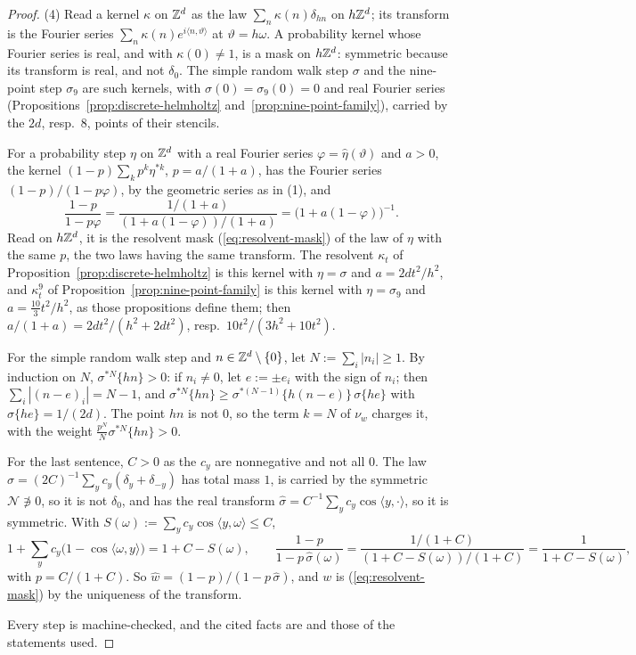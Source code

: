 \begin{proof}
(4) Read a kernel $\kappa$ on $\mathbb{Z}^d$ as the law $\sum_n\kappa(n)\delta_{hn}$ on $h\mathbb{Z}^d$; its
transform is the Fourier series $\sum_n\kappa(n)e^{i\langle n, \vartheta\rangle}$ at
$\vartheta = h\omega$. A probability kernel whose Fourier series is real, and with
$\kappa(0) \ne 1$, is a mask on $h\mathbb{Z}^d$: symmetric because its transform is real, and not
$\delta_0$. The simple random walk step $\sigma$ and the nine-point step $\sigma_9$ are such
kernels, with $\sigma(0) = \sigma_9(0) = 0$ and real Fourier series
(Propositions~\ref{prop:discrete-helmholtz} and~\ref{prop:nine-point-family}), carried by the
$2d$, resp.\ $8$, points of their stencils.

For a probability step $\eta$ on $\mathbb{Z}^d$ with a real Fourier series
$\varphi = \widehat{\eta}(\vartheta)$ and $a > 0$, the kernel $(1 - p)\sum_kp^k\eta^{*k}$,
$p = a/(1+a)$, has the Fourier series $(1-p)/(1 - p\varphi)$, by the geometric series as in (1),
and
\[
\frac{1 - p}{1 - p\varphi} = \frac{1/(1+a)}{(1 + a(1-\varphi))/(1+a)} = \bigl(1 + a(1 - \varphi)\bigr)^{-1} .
\]
Read on $h\mathbb{Z}^d$, it is the resolvent mask (\ref{eq:resolvent-mask}) of the law of $\eta$ with the
same $p$, the two laws having the same transform. The resolvent $\kappa_t$ of
Proposition~\ref{prop:discrete-helmholtz} is this kernel with
$\eta = \sigma$ and $a = 2dt^2/h^2$, and $\kappa^9_t$ of Proposition~\ref{prop:nine-point-family}
is this kernel with $\eta = \sigma_9$ and $a = \tfrac{10}{3}t^2/h^2$, as those propositions define
them; then $a/(1+a) = 2dt^2/(h^2 + 2dt^2)$, resp.\ $10t^2/(3h^2 + 10t^2)$.

For the simple random walk step and $n \in \mathbb{Z}^d \setminus \{0\}$, let $N := \sum_i|n_i| \ge 1$.
By induction on $N$, $\sigma^{*N}\{hn\} > 0$: if $n_i \ne 0$, let $e := \pm e_i$ with the sign of
$n_i$; then $\sum_i|(n - e)_i| = N - 1$, and $\sigma^{*N}\{hn\} \ge \sigma^{*(N-1)}\{h(n - e)\}\,
\sigma\{he\}$ with $\sigma\{he\} = 1/(2d)$. The point $hn$ is not $0$, so the term $k = N$ of
$\nu_w$ charges it, with the weight $\tfrac{p^N}{N}\sigma^{*N}\{hn\} > 0$.

For the last sentence, $C > 0$ as the $c_y$ are nonnegative and not all $0$. The law
$\sigma = (2C)^{-1}\sum_yc_y(\delta_y + \delta_{-y})$ has total mass $1$, is carried by the
symmetric $\mathcal{N} \not\ni 0$, so it is not $\delta_0$, and has the real transform
$\widehat{\sigma} = C^{-1}\sum_yc_y\cos\langle y, \cdot\rangle$, so it is symmetric. With
$S(\omega) := \sum_yc_y\cos\langle y, \omega\rangle \le C$,
\[
1 + \sum_yc_y\bigl(1 - \cos\langle\omega, y\rangle\bigr) = 1 + C - S(\omega) ,\qquad
\frac{1 - p}{1 - p\,\widehat{\sigma}(\omega)} = \frac{1/(1+C)}{(1 + C - S(\omega))/(1 + C)}
= \frac{1}{1 + C - S(\omega)} ,
\]
with $p = C/(1+C)$. So $\widehat{w} = (1 - p)/(1 - p\,\widehat{\sigma})$, and $w$ is
(\ref{eq:resolvent-mask}) by the uniqueness of the transform.

Every step is machine-checked, and the cited facts are  and those of the statements
used.
\end{proof}


